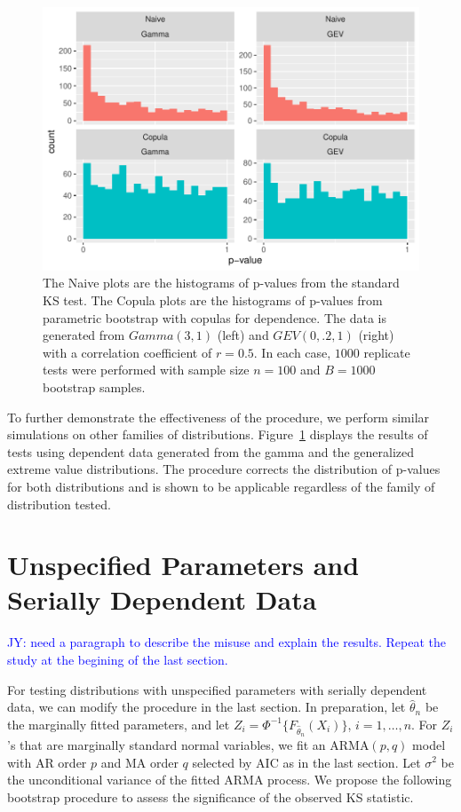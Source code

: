 \documentclass[12pt, letterpaper, titlepage]{article}
\newcommand{\jy}[1]{\textcolor{blue}{JY: #1}}
\begin{document}
\begin{figure}[tbp]
  \centering
  \includegraphics[width=\textwidth]{hist_gamma_gev_D}
  \caption{The Naive plots are the histograms of p-values from the standard KS
  test. The Copula plots are the histograms of p-values from parametric
  bootstrap with copulas for dependence. The data is generated from $Gamma(3,
  1)$ (left) and $GEV(0, .2, 1)$ (right) with a correlation coefficient of $r =
  0.5$. In each case, $1000$ replicate tests were performed with sample size $n
  = 100$ and $B = 1000$ bootstrap samples.}
  \label{fig:hist_gamma_gev_D}
\end{figure}

To further demonstrate the effectiveness of the procedure, we perform similar
simulations on other families of distributions.
Figure~\ref{fig:hist_gamma_gev_D} displays the results of tests using dependent
data generated from the gamma and the generalized extreme value distributions.
The procedure corrects the distribution of p-values for both distributions and
is shown to be applicable regardless of the family of distribution tested.


\section{Unspecified Parameters and Serially Dependent Data}
\label{sec:fittedwithdependence}

\jy{need a paragraph to describe the misuse and explain the results. Repeat the
  study at the begining of the last section.}

For testing distributions with unspecified parameters with serially dependent
data, we can modify the procedure in the last section. In preparation, let
$\hat\theta_n$ be the marginally fitted parameters, and let
$Z_i = \Phi^{-1} \{F_{\hat\theta_n}(X_i)\}$, $i = 1, \ldots, n$.
For $Z_i$'s that are marginally standard normal variables, we fit an
ARMA$(p,q)$ model with AR order $p$ and MA order $q$ selected by AIC as in the
last section. Let $\sigma^2$ be the unconditional variance of the fitted ARMA
process. We propose the following bootstrap procedure to assess the
significance of the observed KS statistic.
\end{document}
